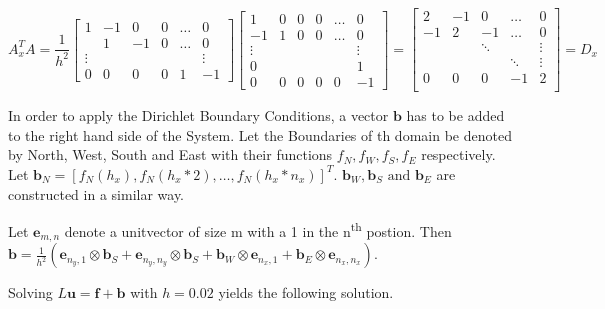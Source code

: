 \documentclass{article}
\begin{document}
\begin{equation}
    A_x^T A = \frac{1}{h^2}
    \begin{bmatrix}
        {1}         & {-1}   & {0}   & {0}   & {\ldots}  & {0} \\
        {}        & {1}   & {-1}   & {0}   & {\ldots}  & {0} \\
        {\vdots}    & {}   & {}    & {}    & {}        & {\vdots} \\
        {0}         & {0}    & {0}   & {0}   & {1}       & {-1}
        \end{bmatrix}
    \begin{bmatrix}
    {1} & {0} & {0} & {0} & {\ldots} & {0} \\
    {-1} & {1} & {0} & {0} & {\ldots} & {0} \\
    {\vdots} & {} & {} & {} & {} & {\vdots} \\
    {0} & {} & {} & {} & {} & {1} \\
     {0} & {0} & {0} & {0} & {0} & {-1}
    \end{bmatrix}= 
    \begin{bmatrix}
    	2 & -1 & 0 &  \dots & 0 \\
    	-1 & 2 & -1	&  \dots & 0 \\
    	&  &\ddots&  &  \vdots\\
    	&  &&\ddots&    \vdots\\
    	0&0&0&-1&2\\
    \end{bmatrix}=D_x
\end{equation}


In order to apply the Dirichlet Boundary Conditions, a vector $\mathbf{b}$ has to be added to the right hand side of the System. Let the Boundaries of th domain be denoted by North, West, South and East with their functions $f_N, f_W, f_S, f_E$ respectively. Let $\mathbf{b}_N = \left[f_N(h_x), f_N(h_x*2), \dots, f_N(h_x*n_x)\right]^T$. $\mathbf{b}_W, \mathbf{b}_S \text{ and }  \mathbf{b}_E$ are constructed in a similar way.\par
Let $\mathbf{e}_{m,n}$ denote a unitvector of size m with a 1 in the n\textsuperscript{th} postion.
Then $\mathbf{b} = \frac{1}{h^2}(\mathbf{e}_{n_y,1} \otimes \mathbf{b}_S + \mathbf{e}_{n_y,n_y} \otimes \mathbf{b}_S + \mathbf{b}_W \otimes \mathbf{e}_{n_x,1} + \mathbf{b}_E \otimes \mathbf{e}_{n_x,n_x})$.

Solving $L\mathbf{u} = \mathbf{f}+\mathbf{b}$ with $h=0.02$ yields the following solution.
\end{document}
